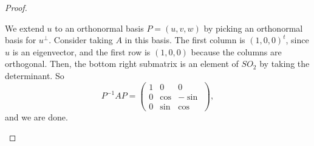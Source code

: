 \begin{proof}
\begin{itemize}
    We extend $u$ to an orthonormal basis $P = (u, v, w)$ by picking an orthonormal basis for $u^\perp$. Consider taking $A$ in this basis. The first column is $(1, 0, 0)^t$, since $u$ is an eigenvector, and the first row is $(1, 0, 0)$ because the columns are orthogonal. Then, the bottom right submatrix is an element of $SO_2$ by taking the determinant. 
    So \[P^{-1} AP =
    \begin{pmatrix}
        1 & 0 & 0 \\
        0 & \cos & -\sin \\
        0 & \sin & \cos
    \end{pmatrix},
    \]
    and we are done.
\end{itemize}

\end{proof}

\newpage